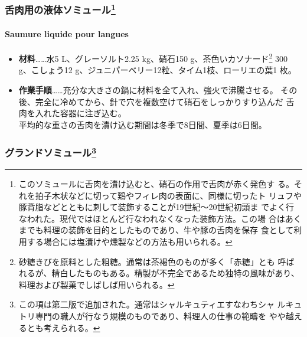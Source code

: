 \begin{recette}
{\subsubsection[舌肉用の液体ソミュール]{\texorpdfstring{舌肉用の液体ソミュール\footnote{このソミュールに舌肉を漬け込むと、硝石の作用で舌肉が赤く発色す
  る。それを拍子木状などに切って鶏やフィレ肉の表面に、同様に切ったト
  リュフや豚背脂などとともに刺して装飾することが19世紀〜20世紀初頭ま
  でよく行なわれた。現代ではほとんど行なわれなくなった装飾方法。この場
  合はあくまでも料理の装飾を目的としたものであり、牛や豚の舌肉を保存
  食として利用する場合には塩漬けや燻製などの方法も用いられる。}}{舌肉用の液体ソミュール}}\label{ux820cux8089ux7528ux306eux6db2ux4f53ux30bdux30dfux30e5ux30fcux30eb15}}

\hypertarget{saumure-liquide-pour-langues}{%
\paragraph{Saumure liquide pour
langues}\label{saumure-liquide-pour-langues}}


\begin{itemize}
\item
  \textbf{材料}\ldots{}\ldots{}水5 L、グレーソルト2.25 kg、硝石150
  g、茶色いカソナード\footnote{砂糖きびを原料とした粗糖。通常は茶褐色のものが多く「赤糖」とも
    呼ばれるが、精白したものもある。精製が不完全であるため独特の風味があり、
    料理および製菓でしばしば用いられる。} 300 g、こしょう12
  g、ジュニパーベリー12粒、タイム1枝、ローリエの葉1 枚。
\item
  \textbf{作業手順}\ldots{}\ldots{}充分な大きさの鍋に材料を全て入れ、強火で沸騰させる。
  その後、完全に冷めてから、針で穴を複数空けて硝石をしっかりすり込んだ
  舌肉を入れた容器に注ぎ込む。\\
  平均的な重さの舌肉を漬け込む期間は冬季で8日間、夏季は6日間。
\end{itemize}

\hypertarget{ux30b0ux30e9ux30f3ux30c9ux30bdux30dfux30e5ux30fcux30eb17}{%
\subsubsection[グランドソミュール]{\texorpdfstring{グランドソミュール\footnote{この項は第二版で追加された。通常はシャルキュティエすなわちシャ
  ルキュトリ専門の職人が行なう規模のものであり、料理人の仕事の範疇を
  やや越えるとも考えられる。}}{グランドソミュール}}\label{ux30b0ux30e9ux30f3ux30c9ux30bdux30dfux30e5ux30fcux30eb17}}


\end{recette}

